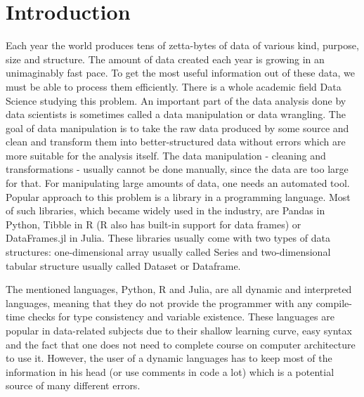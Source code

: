 \chapter*{Introduction}

Each year the world produces tens of zetta-bytes of data of various kind, purpose, size and structure.
The amount of data created each year is growing in an unimaginably fast pace.
To get the most useful information out of these data, we must be able to process them efficiently.
There is a whole academic field Data Science studying this problem.
An important part of the data analysis done by data scientists is sometimes called a data manipulation or data wrangling.
The goal of data manipulation is to take the raw data produced by some source and clean and transform them into
better-structured data without errors which are more suitable for the analysis itself.
The data manipulation - cleaning and transformations - usually cannot be done manually, since the data are too large
for that.
For manipulating large amounts of data, one needs an automated tool.
Popular approach to this problem is a library in a programming language.
Most of such libraries, which became widely used in the industry, are Pandas in Python, Tibble in R (R also has built-in
support for data frames) or DataFrames.jl in Julia.
These libraries usually come with two types of data structures: one-dimensional array usually called Series
and two-dimensional tabular structure usually called Dataset or Dataframe.


The mentioned languages, Python, R and Julia, are all dynamic and interpreted languages, meaning that they do not provide
the programmer with any compile-time checks for type consistency and variable existence.
These languages are popular in data-related subjects due to their shallow learning curve, easy syntax and the fact that
one does not need to complete course on computer architecture to use it.
However, the user of a dynamic languages has to keep most of the information in his head (or use comments in code a lot)
which is a potential source of many different errors. %

